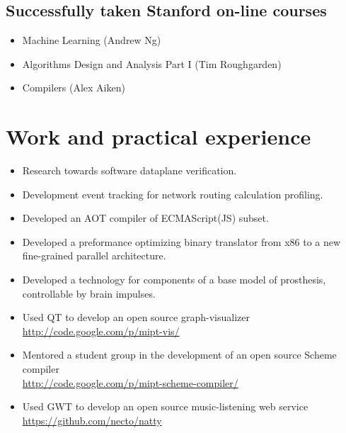 \documentclass[letterpaper]{resume}
\begin{document}
\subsection{Successfully taken Stanford on-line courses}
\begin{itemize}
    \item Machine Learning (Andrew Ng)
    \item Algorithms Design and Analysis Part I (Tim Roughgarden)
    \item Compilers (Alex Aiken)
\end{itemize}

\pagebreak
\section{Work and practical experience}

\begin{itemize}
  \item Research towards software dataplane verification.
\end{itemize}
\begin{itemize}
  \item Development event tracking for network routing calculation profiling.
\end{itemize}
\begin{itemize}
  \item Developed an AOT compiler of ECMAScript(JS) subset.
\end{itemize}
\begin{itemize}
  \item Developed a preformance optimizing binary translator from x86 to a new fine-grained parallel architecture.
\end{itemize}
\begin{itemize}
  \item Developed a technology for components of a base model of prosthesis, controllable by brain impulses.
\end{itemize}
\begin{itemize}
    \item Used QT to develop an open source graph-visualizer\\ \url{http://code.google.com/p/mipt-vis/}
    \item Mentored a student group in the development of an open source Scheme compiler\\ \url{http://code.google.com/p/mipt-scheme-compiler/}
\end{itemize}
\begin{itemize}
    \item Used GWT to develop an open source music-listening web service \\\url{https://github.com/necto/natty}
\end{itemize}
\end{document}
